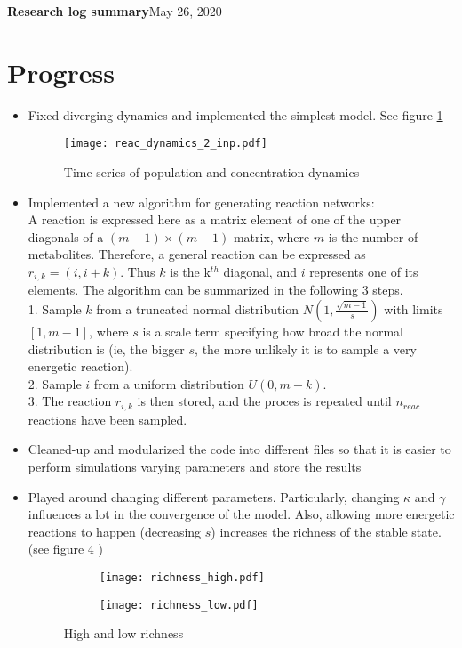 \documentclass[10pt,letterpaper]{article}
\begin{document}
	
    \LARGE{\textbf{Research log summary}}\hfill\Large{May 26, 2020}
    \section*{Progress}
		\begin{itemize}
			\item Fixed diverging dynamics and implemented the simplest model. See figure \ref{fig:dynamics}
		
    	\begin{figure}[h]
    		\centering
    		\texttt{[image: reac\_dynamics\_2\_inp.pdf]}
    		\caption{Time series of population and concentration dynamics}
    		\label{fig:dynamics}
    	\end{figure}
    		\item Implemented a new algorithm for generating reaction networks:\\
    		A reaction is expressed here as a matrix element of one of the upper diagonals of a $ (m-1)\times(m-1) $ matrix, where $ m $ is the number of metabolites. Therefore, a general reaction can be expressed as $ r_{i,k} = (i, i+k) $. Thus $ k $ is the k$ ^{th} $ diagonal, and $ i $ represents one of its elements. The algorithm can be summarized in the following 3 steps.\\
			1. Sample $ k $  from  a truncated normal distribution $N(1,  \frac{\sqrt {m - 1}}{s})$ with limits $ [1, m-1] $, where $ s $ is a scale term specifying how broad the normal distribution is (ie, the bigger $ s $, the more unlikely it is to sample a very energetic reaction).\\
			2. Sample $ i $ from a uniform distribution $ U(0, m-k) $.\\
			3. The reaction $ r_{i,k} $ is then stored, and the proces is repeated until $ n_{reac} $ reactions have been sampled.\\
    	\item Cleaned-up and modularized the code into different files so that it is easier to perform simulations varying parameters and store the results\\
    	\item Played around changing different parameters. Particularly, changing $ \kappa $ and $ \gamma $ influences a lot in the convergence of the model. Also, allowing more energetic reactions to happen (decreasing $ s $) increases the richness of the stable state. (see figure \ref{fig:richnesss} )
    
	    \begin{figure}
	    	\centering
	    	\begin{subfigure}[b]{0.49\textwidth}
	    		\centering
	    		\texttt{[image: richness\_high.pdf]}
	    		\label{fig:y equals x}
	    	\end{subfigure}
	    	\hfill
	    	\begin{subfigure}[b]{0.49\textwidth}
	    		\centering
	    		\texttt{[image: richness\_low.pdf]}
	    		\label{fig:five over x}
	    	\end{subfigure}
	    	\caption{High and low richness}
	    	\label{fig:richnesss}
	    \end{figure}
    \end{itemize}
\end{document}
